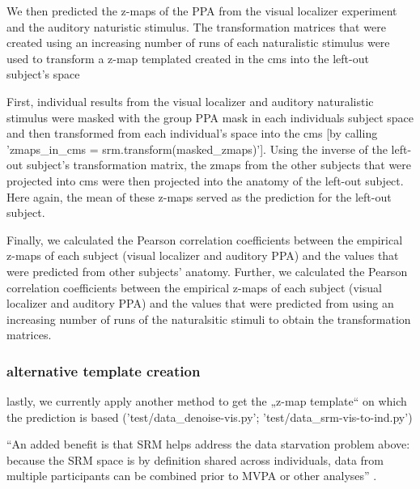 We then predicted the z-maps of the PPA from the visual localizer experiment and
the auditory naturistic stimulus.
%
The transformation matrices that were created using an increasing number of runs
of each naturalistic stimulus were used to transform a z-map templated created
in the \ac{cms} into the left-out subject's space

First, individual results from the visual localizer and auditory naturalistic
stimulus were masked with the group PPA mask in each individuals subject space
and then transformed from each individual's space into the \ac{cms} [by calling
'zmaps\_in\_cms = srm.transform(masked\_zmaps)'].
Using the inverse of the left-out subject's transformation matrix, the zmaps
from the other subjects that were projected into \ac{cms} were then projected
into the anatomy of the left-out subject.
%
Here again, the mean of these z-maps served as the prediction for the left-out
subject.


Finally, we calculated the Pearson correlation coefficients between the
empirical z-maps of each subject (visual localizer and auditory PPA) and the
values that were predicted from other subjects' anatomy.
%
Further, we calculated the Pearson correlation coefficients between the
empirical z-maps of each subject (visual localizer and auditory PPA) and the
values that were predicted from using an increasing number of runs of the
naturalsitic stimuli to obtain the transformation matrices.


\subsubsection{alternative template creation}
%
lastly, we currently apply another method to get the „z-map template“ on which
the prediction is based ('test/data\_denoise-vis.py';
'test/data\_srm-vis-to-ind.py')

%
``An added benefit is that SRM helps address the data starvation problem above:
because the SRM space is by definition shared across individuals, data from
multiple participants can be combined prior to MVPA or other analyses''
\citep{cohen2017computational}.


